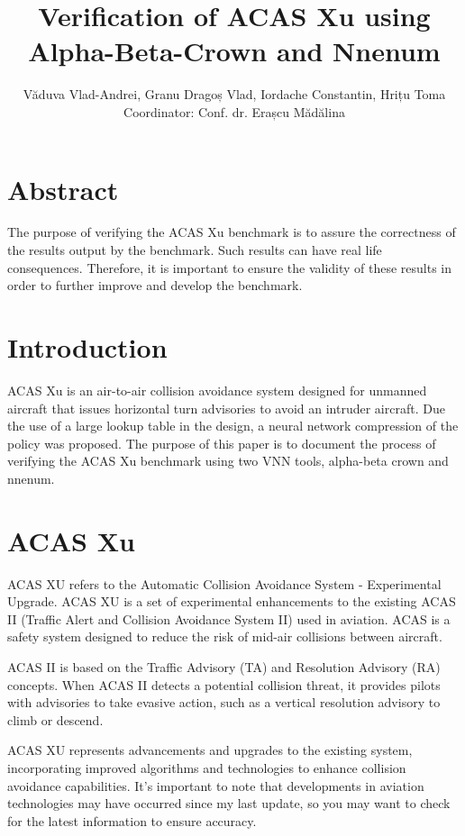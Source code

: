 \documentclass{article}
\title{Verification of ACAS Xu using Alpha-Beta-Crown and Nnenum }
\author{Văduva Vlad-Andrei, Granu Dragoș Vlad, Iordache Constantin, Hrițu Toma\\[1cm]{\small Coordinator: Conf. dr. Erașcu Mădălina}}
\begin{document}
\maketitle
\newpage
\tableofcontents
\clearpage
\section{Abstract}
The purpose of verifying the ACAS Xu benchmark is to assure the correctness of the results output by the benchmark. Such results can have real life consequences. Therefore, it is important to ensure the validity of these results in order to further improve and develop the benchmark.
\section{Introduction\cite{vnn}}
ACAS Xu is an air-to-air collision avoidance system designed for unmanned aircraft that issues horizontal turn advisories to avoid an intruder aircraft. Due the use of a large lookup table in the design, a neural network compression of the policy was proposed. The purpose of this paper is to document the process of verifying the ACAS Xu benchmark using two VNN tools, alpha-beta crown and nnenum.
\section{ACAS Xu \cite{acasxu}}
ACAS XU refers to the Automatic Collision Avoidance System - Experimental Upgrade. ACAS XU is a set of experimental enhancements to the existing ACAS II (Traffic Alert and Collision Avoidance System II) used in aviation. ACAS is a safety system designed to reduce the risk of mid-air collisions between aircraft.

ACAS II is based on the Traffic Advisory (TA) and Resolution Advisory (RA) concepts. When ACAS II detects a potential collision threat, it provides pilots with advisories to take evasive action, such as a vertical resolution advisory to climb or descend.

ACAS XU represents advancements and upgrades to the existing system, incorporating improved algorithms and technologies to enhance collision avoidance capabilities. It's important to note that developments in aviation technologies may have occurred since my last update, so you may want to check for the latest information to ensure accuracy.
\end{document}
